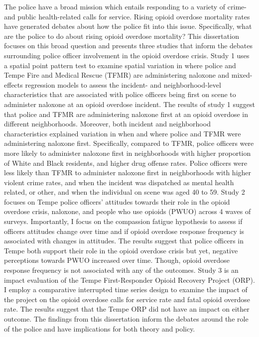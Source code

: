 The police have a broad mission which entails responding to a variety of crime- and public health-related calls for service. Rising opioid overdose mortality rates have generated debates about how the police fit into this issue. Specifically, what are the police to do about rising opioid overdose mortality? This dissertation focuses on this broad question and presents three studies that inform the debates surrounding police officer involvement in the opioid overdose crisis. Study 1 uses a spatial point pattern test to examine spatial variation in where police and Tempe Fire and Medical Rescue (TFMR) are administering naloxone and mixed-effects regression models to assess the incident- and neighborhood-level characteristics that are associated with police officers being first on scene to administer naloxone at an opioid overdose incident. The results of study 1 suggest that police and TFMR are administering naloxone first at an opioid overdose in different neighborhoods. Moreover, both incident and neighborhood characteristics explained variation in when and where police and TFMR were administering naloxone first. Specifically, compared to TFMR, police officers were more likely to administer naloxone first in neighborhoods with higher proportion of White and Black residents, and higher drug offense rates. Police officers were less likely than TFMR to administer naloxone first in neighborhoods with higher violent crime rates, and when the incident was dispatched as mental health related, or other, and when the individual on scene was aged 40 to 59. Study 2 focuses on Tempe police officers' attitudes towards their role in the opioid overdose crisis, naloxone, and people who use opioids (PWUO) across 4 waves of surveys. Importantly, I focus on the compassion fatigue hypothesis to assess if officers attitudes change over time and if opioid overdose response frequency is associated with changes in attitudes. The results suggest that police officers in Tempe both support their role in the opioid overdose crisis but yet, negative perceptions towards PWUO increased over time. Though, opioid overdose response frequency is not associated with any of the outcomes. Study 3 is an impact evaluation of the Tempe First-Responder Opioid Recovery Project (ORP). I employ a comparative interrupted time series design to examine the impact of the project on the opioid overdose calls for service rate and fatal opioid overdose rate. The results suggest that the Tempe ORP did not have an impact on either outcome. The findings from this dissertation inform the debates around the role of the police and have implications for both theory and policy.